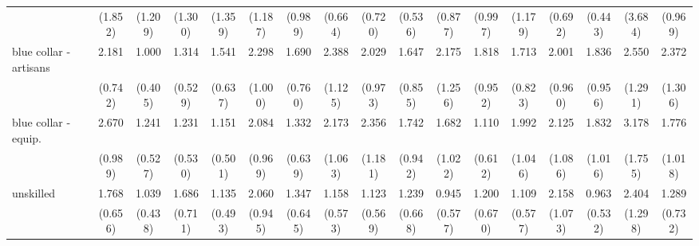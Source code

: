{\begin{tabular}{l*{16}{c}}
                    &     (1.852)         &     (1.209)         &     (1.300)         &     (1.359)         &     (1.187)         &     (0.989)         &     (0.664)         &     (0.720)         &     (0.536)         &     (0.877)         &     (0.997)         &     (1.179)         &     (0.692)         &     (0.443)         &     (3.684)         &     (0.969)         \\
[1em]
blue collar - artisans&       2.181\sym{*}  &       1.000         &       1.314         &       1.541         &       2.298         &       1.690         &       2.388         &       2.029         &       1.647         &       2.175         &       1.818         &       1.713         &       2.001         &       1.836         &       2.550         &       2.372         \\
                    &     (0.742)         &     (0.405)         &     (0.529)         &     (0.637)         &     (1.000)         &     (0.760)         &     (1.125)         &     (0.973)         &     (0.855)         &     (1.256)         &     (0.952)         &     (0.823)         &     (0.960)         &     (0.956)         &     (1.291)         &     (1.306)         \\
[1em]
blue collar - equip.&       2.670\sym{**} &       1.241         &       1.231         &       1.151         &       2.084         &       1.332         &       2.173         &       2.356         &       1.742         &       1.682         &       1.110         &       1.992         &       2.125         &       1.832         &       3.178\sym{*}  &       1.776         \\
                    &     (0.989)         &     (0.527)         &     (0.530)         &     (0.501)         &     (0.969)         &     (0.639)         &     (1.063)         &     (1.181)         &     (0.942)         &     (1.022)         &     (0.612)         &     (1.046)         &     (1.086)         &     (1.016)         &     (1.755)         &     (1.018)         \\
[1em]
unskilled           &       1.768         &       1.039         &       1.686         &       1.135         &       2.060         &       1.347         &       1.158         &       1.123         &       1.239         &       0.945         &       1.200         &       1.109         &       2.158         &       0.963         &       2.404         &       1.289         \\
                    &     (0.656)         &     (0.438)         &     (0.711)         &     (0.493)         &     (0.945)         &     (0.645)         &     (0.573)         &     (0.569)         &     (0.668)         &     (0.577)         &     (0.670)         &     (0.577)         &     (1.073)         &     (0.532)         &     (1.298)         &     (0.732)         \\

\end{tabular}}
